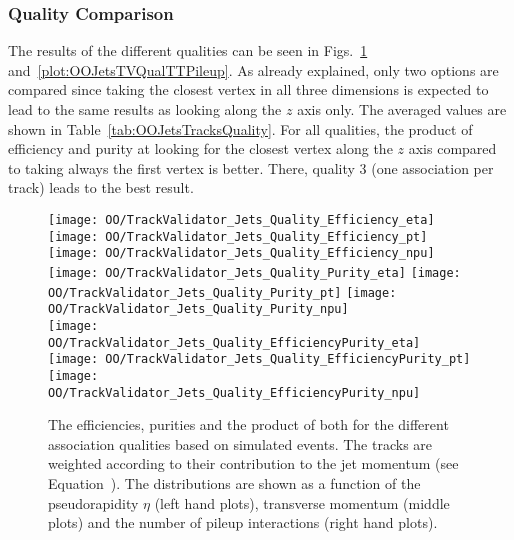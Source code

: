 \subsubsection{Quality Comparison \label{sec:OOJetsTracksQuality} }

The results of the different qualities can be seen in Figs.~\ref{plot:OOJetsTVQualTTSignal} and~\ref{plot:OOJetsTVQualTTPileup}. As already explained, only two options are compared since taking the closest vertex in all three dimensions is expected to lead to the same results as looking along the $z$ axis only. The averaged values are shown in Table~\ref{tab:OOJetsTracksQuality}. For all qualities, the product of efficiency and purity at looking for the closest vertex along the $z$ axis compared to taking always the first vertex is better. There, quality 3 (one association per track) leads to the best result.

\begin{figure}[h!t]
  \centering
  \texttt{[image: OO/TrackValidator\_Jets\_Quality\_Efficiency\_eta]}
  \texttt{[image: OO/TrackValidator\_Jets\_Quality\_Efficiency\_pt]}
  \texttt{[image: OO/TrackValidator\_Jets\_Quality\_Efficiency\_npu]}
  \\
  \texttt{[image: OO/TrackValidator\_Jets\_Quality\_Purity\_eta]}
  \texttt{[image: OO/TrackValidator\_Jets\_Quality\_Purity\_pt]}
  \texttt{[image: OO/TrackValidator\_Jets\_Quality\_Purity\_npu]}
  \\
  \texttt{[image: OO/TrackValidator\_Jets\_Quality\_EfficiencyPurity\_eta]}
  \texttt{[image: OO/TrackValidator\_Jets\_Quality\_EfficiencyPurity\_pt]}
  \texttt{[image: OO/TrackValidator\_Jets\_Quality\_EfficiencyPurity\_npu]}
  \caption[Efficiencies, purities and their product for the different qualities based on simulated \ttbar events with jet weight]{The efficiencies, purities and the product of both for the different association qualities based on simulated \ttbar events. The tracks are weighted according to their contribution to the jet momentum (see Equation~). The distributions are shown as a function of the pseudorapidity $\eta$ (left hand plots), transverse momentum (middle plots) and the number of pileup interactions (right hand plots). \label{plot:OOJetsTVQualTTSignal}}
\end{figure}

